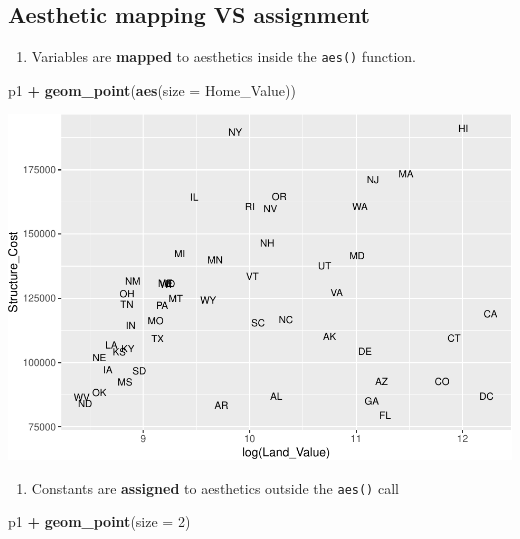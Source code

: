 \documentclass[
]{book}
\newenvironment{Shaded}{\begin{snugshade}}{\end{snugshade}}
\newcommand{\DataTypeTok}[1]{\textcolor[rgb]{0.13,0.29,0.53}{#1}}
\newcommand{\DecValTok}[1]{\textcolor[rgb]{0.00,0.00,0.81}{#1}}
\newcommand{\KeywordTok}[1]{\textcolor[rgb]{0.13,0.29,0.53}{\textbf{#1}}}
\newcommand{\NormalTok}[1]{#1}
\newcommand{\OperatorTok}[1]{\textcolor[rgb]{0.81,0.36,0.00}{\textbf{#1}}}
\newcommand{\StringTok}[1]{\textcolor[rgb]{0.31,0.60,0.02}{#1}}
\providecommand{\tightlist}{%
  \setlength{\itemsep}{0pt}\setlength{\parskip}{0pt}}
\begin{document}
\hypertarget{aesthetic-mapping-vs-assignment}{%
\subsection{Aesthetic mapping VS assignment}\label{aesthetic-mapping-vs-assignment}}

\begin{enumerate}
\def\labelenumi{\arabic{enumi}.}
\tightlist
\item
  Variables are \textbf{mapped} to aesthetics inside the \texttt{aes()} function.
\end{enumerate}

\begin{Shaded}
\begin{Highlighting}[]
\NormalTok{p1 }\OperatorTok{+}
\StringTok{  }\KeywordTok{geom\_point}\NormalTok{(}\KeywordTok{aes}\NormalTok{(}\DataTypeTok{size =}\NormalTok{ Home\_Value))}
\end{Highlighting}
\end{Shaded}

\includegraphics{R/Rgraphics/figures/unnamed-chunk-150-1.pdf}

\begin{enumerate}
\def\labelenumi{\arabic{enumi}.}
\setcounter{enumi}{1}
\tightlist
\item
  Constants are \textbf{assigned} to aesthetics outside the \texttt{aes()} call
\end{enumerate}

\begin{Shaded}
\begin{Highlighting}[]
\NormalTok{p1 }\OperatorTok{+}
\StringTok{  }\KeywordTok{geom\_point}\NormalTok{(}\DataTypeTok{size =} \DecValTok{2}\NormalTok{)}
\end{Highlighting}
\end{Shaded}
\end{document}
